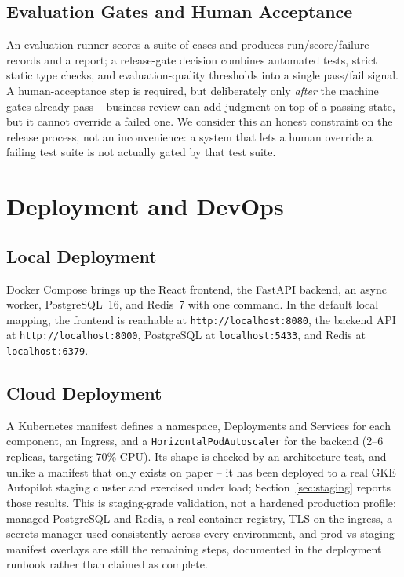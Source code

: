 \documentclass[conference]{IEEEtran}
\begin{document}
\subsection{Evaluation Gates and Human Acceptance}
An evaluation runner scores a suite of cases and produces run/score/failure
records and a report; a release-gate decision combines automated tests,
strict static type checks, and evaluation-quality thresholds into a single
pass/fail signal. A human-acceptance step is required, but deliberately
only \emph{after} the machine gates already pass -- business review can
add judgment on top of a passing state, but it cannot override a failed
one. We consider this an honest constraint on the release process, not an
inconvenience: a system that lets a human override a failing test suite is
not actually gated by that test suite.

\section{Deployment and DevOps}

\subsection{Local Deployment}
Docker Compose brings up the React frontend, the FastAPI backend, an async
worker, PostgreSQL~16, and Redis~7 with one command. In the default local
mapping, the frontend is reachable at \texttt{http://localhost:8080}, the
backend API at \texttt{http://localhost:8000}, PostgreSQL at
\texttt{localhost:5433}, and Redis at \texttt{localhost:6379}.

\subsection{Cloud Deployment}
A Kubernetes manifest defines a namespace, Deployments and Services for
each component, an Ingress, and a \texttt{HorizontalPodAutoscaler} for the
backend (2--6 replicas, targeting 70\% CPU). Its shape is checked by an
architecture test, and -- unlike a manifest that only exists on paper --
it has been deployed to a real GKE Autopilot staging cluster and exercised
under load; Section~\ref{sec:staging} reports those results. This is
staging-grade validation, not a hardened production profile: managed
PostgreSQL and Redis, a real container registry, TLS on the ingress, a
secrets manager used consistently across every environment, and
prod-vs-staging manifest overlays are still the remaining steps, documented
in the deployment runbook rather than claimed as complete.
\end{document}
